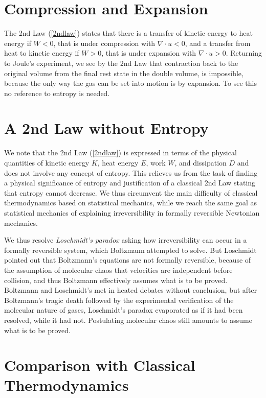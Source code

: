 \section{Compression and Expansion}

The 2nd Law (\ref{2ndlaw}) states that there is a transfer
of kinetic energy to heat energy if $W<0$, that is under compression
with $\nabla\cdot u<0$, and a transfer from heat to kinetic energy
if $W>0$, that is under expansion with $\nabla\cdot u>0$.
Returning to Joule's experiment, we see by the 2nd Law that contraction back
to the original volume from the final rest state in the double volume,
is impossible, because the only way the gas can be set into motion is
by expansion. To see this no reference to entropy is needed.

\section{A 2nd Law without Entropy}

We note that the 2nd Law (\ref{2ndlaw}) is expressed in terms of
the physical quantities of kinetic energy $K$, heat energy $E$, work $W$,
and dissipation $D$ and does not involve any concept of entropy.
This relieves us from the task of finding a physical significance of
entropy and justification of a classical 2nd Law stating that entropy
cannot decrease.
We thus circumvent the main difficulty of classical thermodynamics
based on statistical mechanics, while we reach the same goal
as statistical mechanics
of explaining irreversibility in formally reversible Newtonian mechanics.

We thus resolve \emph{Loschmidt's paradox} \cite{loschmidt} asking
how irreversibility can occur in a formally reversible system,
which Boltzmann attempted to solve.
But Loschmidt pointed out that Boltzmann's equations
are not formally reversible, because of the assumption of
molecular chaos that velocities are independent before
collision, and thus Boltzmann effectively assumes what is to be proved.
Boltzmann and Loschmidt's met in heated debates without conclusion,
but after Boltzmann's tragic death followed by the experimental verification
of the molecular nature of gases, Loschmidt's paradox
evaporated as if it had been resolved, while it had not.
Postulating molecular chaos still amounts to
assume what is to be proved.

\section{Comparison with Classical Thermodynamics}

